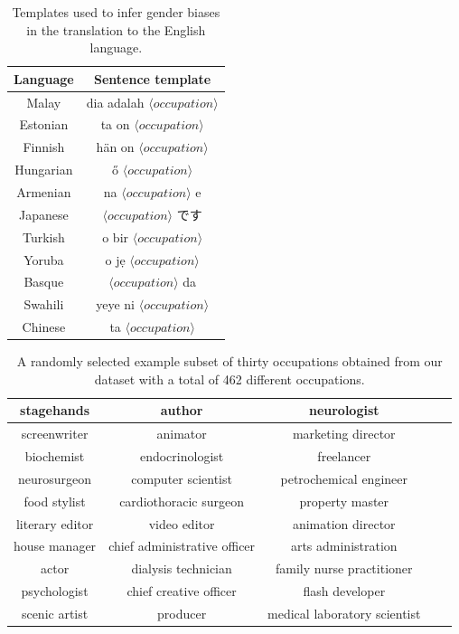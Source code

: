 \documentclass{article}
\begin{document}
\begin{table}[H]
	\centering
	\begin{tabular}{|c|c|}
	\hline
	Language 	& Sentence template \\ \hline \hline
	Malay		& dia adalah $\langle occupation \rangle$ \\ \hline
	Estonian	& ta on $\langle occupation \rangle$ \\ \hline
	Finnish		& hän on $\langle occupation \rangle$ \\ \hline
	Hungarian	& ő $\langle occupation \rangle$ \\ \hline
	Armenian	& na $\langle occupation \rangle$ e \\ \hline
	Japanese	& $\langle occupation \rangle$ です\\ \hline
	Turkish		& o bir $\langle occupation \rangle$ \\ \hline
	Yoruba		& o jẹ $\langle occupation \rangle$ \\ \hline
	Basque		& $\langle occupation \rangle$ da \\ \hline
	Swahili		& yeye ni $\langle occupation \rangle$ \\ \hline
	Chinese		& ta $\langle occupation \rangle$ \\ \hline
	\end{tabular}
	\caption{Templates used to infer gender biases in the translation to the English language.}
	\label{tab:templates}
\end{table}

\begin{table}[H]
	\centering
	\begin{tabular}{|c|c|c|c|c|}
	\hline
	stagehands & author & neurologist \\ \hline
	screenwriter & animator & marketing director \\ \hline
	biochemist & endocrinologist & freelancer \\ \hline
	neurosurgeon & computer scientist & petrochemical engineer \\ \hline
	food stylist & cardiothoracic surgeon & property master \\ \hline
	literary editor & video editor & animation director \\ \hline
	house manager & chief administrative officer & arts administration \\ \hline
	actor & dialysis technician & family nurse practitioner \\ \hline
	psychologist & chief creative officer & flash developer \\ \hline
	scenic artist & producer & medical laboratory scientist \\ \hline
	\end{tabular}
	\caption{A randomly selected example subset of thirty occupations obtained from our dataset with a total of 462 different occupations.}
	\label{tab:occupations-examples}
\end{table}
\end{document}

